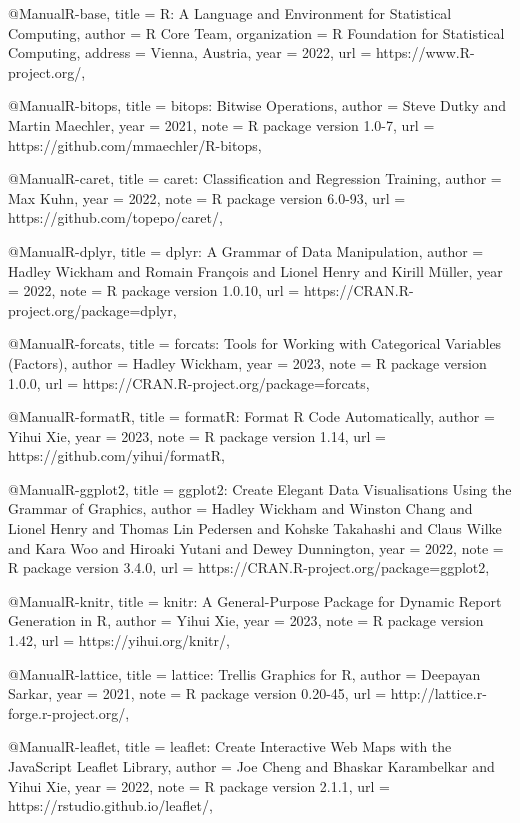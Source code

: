 @Manual{R-base,
  title = {R: A Language and Environment for Statistical Computing},
  author = {{R Core Team}},
  organization = {R Foundation for Statistical Computing},
  address = {Vienna, Austria},
  year = {2022},
  url = {https://www.R-project.org/},
}

@Manual{R-bitops,
  title = {bitops: Bitwise Operations},
  author = {Steve Dutky and Martin Maechler},
  year = {2021},
  note = {R package version 1.0-7},
  url = {https://github.com/mmaechler/R-bitops},
}

@Manual{R-caret,
  title = {caret: Classification and Regression Training},
  author = {Max Kuhn},
  year = {2022},
  note = {R package version 6.0-93},
  url = {https://github.com/topepo/caret/},
}

@Manual{R-dplyr,
  title = {dplyr: A Grammar of Data Manipulation},
  author = {Hadley Wickham and Romain François and Lionel Henry and Kirill Müller},
  year = {2022},
  note = {R package version 1.0.10},
  url = {https://CRAN.R-project.org/package=dplyr},
}

@Manual{R-forcats,
  title = {forcats: Tools for Working with Categorical Variables (Factors)},
  author = {Hadley Wickham},
  year = {2023},
  note = {R package version 1.0.0},
  url = {https://CRAN.R-project.org/package=forcats},
}

@Manual{R-formatR,
  title = {formatR: Format R Code Automatically},
  author = {Yihui Xie},
  year = {2023},
  note = {R package version 1.14},
  url = {https://github.com/yihui/formatR},
}

@Manual{R-ggplot2,
  title = {ggplot2: Create Elegant Data Visualisations Using the Grammar of Graphics},
  author = {Hadley Wickham and Winston Chang and Lionel Henry and Thomas Lin Pedersen and Kohske Takahashi and Claus Wilke and Kara Woo and Hiroaki Yutani and Dewey Dunnington},
  year = {2022},
  note = {R package version 3.4.0},
  url = {https://CRAN.R-project.org/package=ggplot2},
}

@Manual{R-knitr,
  title = {knitr: A General-Purpose Package for Dynamic Report Generation in R},
  author = {Yihui Xie},
  year = {2023},
  note = {R package version 1.42},
  url = {https://yihui.org/knitr/},
}

@Manual{R-lattice,
  title = {lattice: Trellis Graphics for R},
  author = {Deepayan Sarkar},
  year = {2021},
  note = {R package version 0.20-45},
  url = {http://lattice.r-forge.r-project.org/},
}

@Manual{R-leaflet,
  title = {leaflet: Create Interactive Web Maps with the JavaScript Leaflet
Library},
  author = {Joe Cheng and Bhaskar Karambelkar and Yihui Xie},
  year = {2022},
  note = {R package version 2.1.1},
  url = {https://rstudio.github.io/leaflet/},
}

